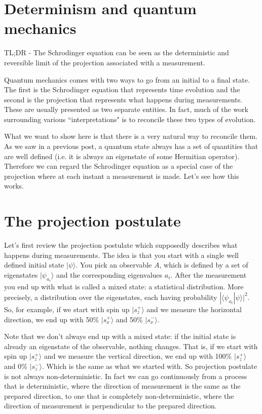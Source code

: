 \documentclass[aps,pra,10pt,floatfix,nofootinbib]{revtex4-1}
\theoremstyle{definition}
\begin{document}
\section{Determinism and quantum mechanics}
TL;DR - The Schrodinger equation can be seen as the deterministic and reversible limit of the projection associated with a measurement.

Quantum mechanics comes with two ways to go from an initial to a final state. The first is the Schrodinger equation that represents time evolution and the second is the projection that represents what happens during measurements. These are usually presented as two separate entities. In fact, much of the work surrounding various ``interpretations" is to reconcile these two types of evolution.

What we want to show here is that there is a very natural way to reconcile them. As we saw in a previous post, a quantum state always has a set of quantities that are well defined (i.e. it is always an eigenstate of some Hermitian operator). Therefore we can regard the Schrodinger equation as a special case of the projection where at each instant a measurement is made. Let's see how this works.

\section{The projection postulate}

Let's first review the projection postulate which supposedly describes what happens during measurements. The idea is that you start with a single well defined initial state $|\psi\rangle$. You pick an observable $A$, which is defined by a set of eigenstates $|\psi_{a_i}\rangle$ and the corresponding eigenvalues $a_i$. After the measurement you end up with what is called a mixed state: a statistical distribution. More precisely, a distribution over the eigenstates, each having probability $|\langle \psi_{a_i} | \psi \rangle | ^2$. So, for example, if we start with spin up $|s^+_z\rangle$ and we measure the horizontal direction, we end up with 50\% $|s^+_x\rangle$ and 50\% $|s^-_x\rangle$.
 
Note that we don't always end up with a mixed state: if the initial state is already an eigenstate of the observable, nothing changes. That is, if we start with spin up $|s^+_z\rangle$ and we measure the vertical direction, we end up with 100\% $|s^+_z\rangle$ and 0\% $|s^-_z\rangle$. Which is the same as what we started with. So projection postulate is not always non-deterministic. In fact we can go continuously from a process that is deterministic, where the direction of measurement is the same as the prepared direction, to one that is completely non-deterministic, where the direction of measurement is perpendicular to the prepared direction.
\end{document}
